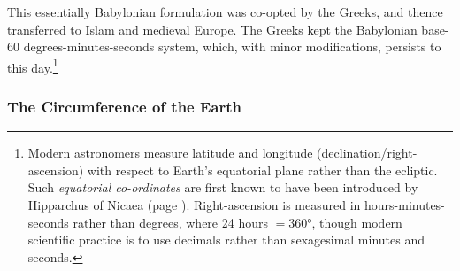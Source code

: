 
This essentially Babylonian formulation was co-opted by the Greeks, and thence transferred to Islam and medieval Europe. The Greeks kept the Babylonian base-60 degrees-minutes-seconds system, which, with minor modifications, persists to this day.\footnote{%
	Modern astronomers measure latitude and longitude (declination/right-ascension) with respect to Earth's equatorial plane rather than the ecliptic. Such \emph{equatorial co-ordinates} are first known to have been introduced by Hipparchus of Nicaea (page \pageref{pg:hipparchus}). Right-ascension is measured in hours-minutes-seconds rather than degrees, where 24 hours $=\ang{360}$, though modern scientific practice is to use decimals rather than sexagesimal minutes and seconds.%
}





\subsubsection*{The Circumference of the Earth}\label{pg:syene}

